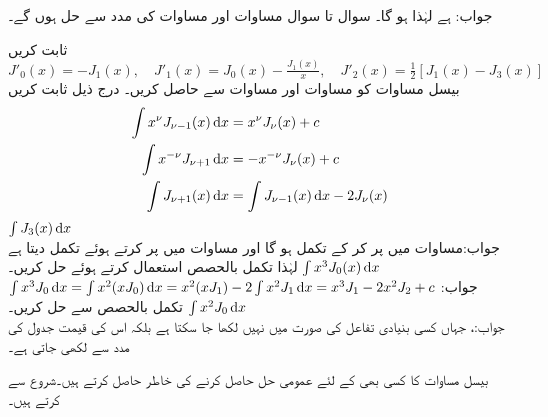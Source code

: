 جواب:  ہے لہٰذا  ہو گا۔
سوال  تا سوال   مساوات  اور مساوات  کی مدد سے حل ہوں گے۔

\quad ثابت کریں 
$J'_0(x)=-J_1(x),\quad J'_1(x)=J_0(x)-\frac{J_1(x)}{x},\quad J'_2(x)=\frac{1}{2}[J_1(x)-J_3(x)]$\\
بیسل مساوات  کو مساوات  اور مساوات  سے حاصل کریں۔
درج ذیل ثابت کریں
\begin{align*} 
\int x^{\nu} J_{\nu-1}(x)\dif x&=x^{\nu}J_{\nu}(x)+c\\
\int x^{-\nu}J_{\nu+1}\dif x&=-x^{-\nu}J_{\nu}(x)+c\\
\int J_{\nu+1}(x)\dif x&=\int J_{\nu-1}(x)\dif x-2J_{\nu}(x)
\end{align*}
\quad
$\int J_3(x)\dif x$\\
جواب:مساوات  میں  پر کر کے تکمل  ہو گا اور مساوات  میں  پر کرتے ہوئے تکمل  دیتا ہے لہٰذا  
 تکمل بالحصص استعمال کرتے  ہوئے حل کریں۔\quad 
$\int x^3J_0(x)\dif x$\\
جواب:
$\int x^3J_0\dif x=\int x^2(xJ_0)\dif x=x^2(xJ_1)-2\int x^2J_1\dif x=x^3J_1-2x^2J_2+c$
  تکمل بالحصص سے حل کریں۔\quad 
$\int x^2J_0\dif x$\\
جواب:، جہاں  کسی بنیادی تفاعل کی صورت میں نہیں لکھا جا سکتا ہے بلکہ اس کی قیمت  جدول کی مدد سے لکھی جاتی ہے۔


بیسل مساوات  کا کسی بھی  کے لئے عمومی حل حاصل کرنے کی خاطر   حاصل کرتے ہیں۔شروع  سے کرتے ہیں۔  

